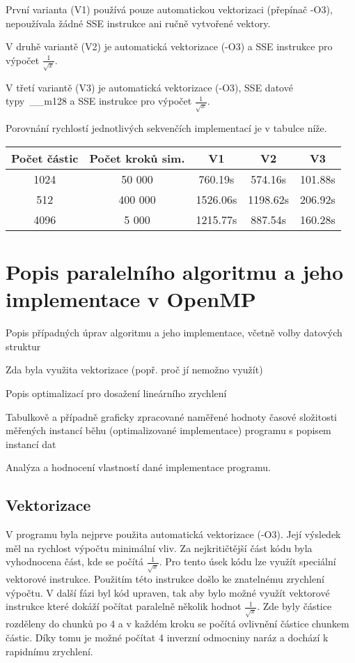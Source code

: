 \documentclass[12pt]{article}
\begin{document}
První varianta (V1) používá pouze automatickou vektorizaci (přepínač -O3), nepoužívala žádné SSE instrukce ani ručně vytvořené vektory.

V druhě variantě (V2) je automatická vektorizace (-O3) a SSE instrukce pro výpočet ${\frac{1}{\sqrt{x}}}$.

V třetí variantě (V3) je automatická vektorizace (-O3), SSE datové typy~\_\_m128 a SSE instrukce pro výpočet ${\frac{1}{\sqrt{x}}}$.

Porovnání rychlostí jednotlivých sekvenčích implementací je v tabulce níže.

\begin{center}
\begin{tabular}{c | c | c | c | c}
\textbf{Počet částic} & \textbf{Počet kroků sim.}  & \textbf{V1} & \textbf{V2} & \textbf{V3} \\ \hline \hline
1024 & 50 000 & 760.19s & 574.16s & 101.88s \\ \hline
512 & 400 000 & 1526.06s & 1198.62s & 206.92s \\ \hline
4096 & 5 000 & 1215.77s & 887.54s & 160.28s \\ \hline
\end{tabular}
\end{center}

\section{Popis paralelního algoritmu a jeho implementace v OpenMP}

    Popis případných úprav algoritmu a jeho implementace, včetně volby datových struktur

    Zda byla využita vektorizace (popř. proč jí nemožno využít)

    Popis optimalizací pro dosažení lineárního zrychlení

    Tabulkově a případně graficky zpracované naměřené hodnoty časové složitosti měřených instancí běhu (optimalizované implementace) programu s popisem instancí dat

    Analýza a hodnocení vlastností dané implementace programu.

\subsection{Vektorizace}

V programu byla nejprve použita automatická vektorizace (-O3). Její výsledek měl na rychlost výpočtu minimální vliv. Za nejkritičtější část kódu byla vyhodnocena část, kde se počítá ${\frac{1}{\sqrt{x}}}$. Pro tento úsek kódu lze využít speciální vektorové instrukce. Použitím této instrukce došlo ke znatelnému zrychlení výpočtu.
V další fázi byl kód upraven, tak aby bylo možné využít vektorové instrukce které dokáží počítat paralelně několik hodnot ${\frac{1}{\sqrt{x}}}$. Zde byly částice rozděleny do chunků po 4 a v každém kroku se počítá ovlivnění částice chunkem částic. Díky tomu je možné počítat 4 inverzní odmocniny naráz a dochází k rapidnímu zrychlení. 
\end{document}
